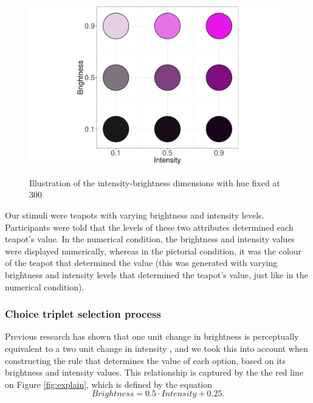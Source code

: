 \documentclass[11pt,a4paper]{article}
\begin{document}
\begin{figure}
\centering
\caption{Illustration of the intensity-brightness dimensions with hue fixed at 300\degree}
\includegraphics[width=1\textwidth]{AE_teapots_Figure_1circles.pdf}
\label{fig:explaincircle}
\end{figure}

Our stimuli were teapots with varying brightness and intensity levels. Participants were told that the levels of these two attributes determined each teapot's value. In the numerical condition, the brightness and intensity values were displayed numerically, whereas in the pictorial condition, it was the colour of the teapot that determined the value (this was generated with varying brightness and intensity levels that determined the teapot's value, just like in the numerical condition).  

\subsubsection{Choice triplet selection process}

Previous research has shown that one unit change in brightness is perceptually equivalent to a two unit change in intensity \cite{Newhall1940}, and we took this into account when constructing the rule that determines the value of each option, based on its brightness and intensity values. This relationship is captured by the the red line on Figure \ref{fig:explain}, which is defined by the equation
\begin{equation} \label{eq:redline}
 Brightness = 0.5 \cdot Intensity+ 0.25.
\end{equation}
\end{document}
